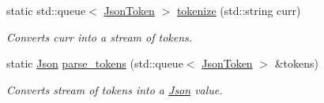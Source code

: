 \begin{DoxyCompactItemize}
static std\+::queue$<$ \hyperlink{structnta_1_1utils_1_1Json_1_1JsonToken}{Json\+Token} $>$ \hyperlink{classnta_1_1utils_1_1Json_a905d67b125a7aadd771bb74a1bb63f34}{tokenize} (std\+::string curr)
\begin{DoxyCompactList}\small\item\em Converts curr into a stream of tokens. \end{DoxyCompactList}\item 
\mbox{\label{classnta_1_1utils_1_1Json_a6952edc41983e76a7e548d9c426bc680}} 
static \hyperlink{classnta_1_1utils_1_1Json}{Json} \hyperlink{classnta_1_1utils_1_1Json_a6952edc41983e76a7e548d9c426bc680}{parse\+\_\+tokens} (std\+::queue$<$ \hyperlink{structnta_1_1utils_1_1Json_1_1JsonToken}{Json\+Token} $>$ \&tokens)
\begin{DoxyCompactList}\small\item\em Converts stream of tokens into a \hyperlink{classnta_1_1utils_1_1Json}{Json} value. \end{DoxyCompactList}\end{DoxyCompactItemize}

